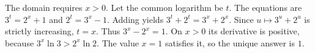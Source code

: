The domain requires $x>0$. Let the common logarithm be $t$. The equations are $3^t=2^x+1$ and $2^t=3^x-1$. Adding yields $3^t+2^t=3^x+2^x$. Since $u\mapsto3^u+2^u$ is strictly increasing, $t=x$. Thus $3^x-2^x=1$. On $x>0$ its derivative is positive, because $3^x\ln3>2^x\ln2$. The value $x=1$ satisfies it, so the unique answer is $\boxed1$.
